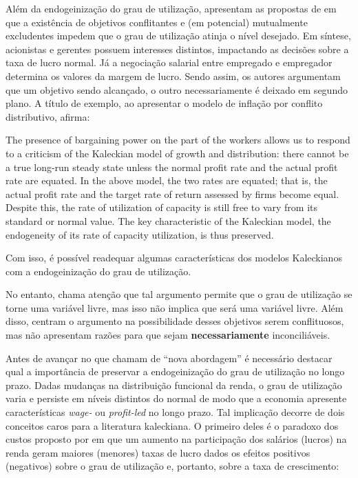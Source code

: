 Além da endogeinização do grau de utilização, \textcite{hein_harrodian_2012} apresentam as propostas de \textcite{dallery_conflicting_2011} em que a existência de objetivos conflitantes e (em potencial) mutualmente excludentes impedem que o grau de utilização atinja o nível desejado. Em síntese, acionistas e gerentes possuem interesses distintos, impactando as decisões sobre a taxa de lucro normal. Já a negociação salarial entre empregado e empregador determina os valores da margem de lucro. Sendo assim, os autores argumentam que um objetivo sendo alcançado, o outro necessariamente é deixado em segundo plano. A título de exemplo, ao apresentar o modelo de inflação por conflito distributivo, \textcite[p.~567]{lavoie_post-keynesian_2015} afirma:
\begin{citacao}
 The presence of bargaining power on the part of the workers allows
us to respond to a criticism of the Kaleckian model of growth and distribution: there
cannot be a true long-run steady state unless the normal profit rate and the actual profit
rate are equated. In the above model, the two rates are equated; that is, the actual profit
rate and the target rate of return assessed by firms become equal. Despite this, the rate
of utilization of capacity is still free to vary from its standard or normal value. The key
characteristic of the Kaleckian model, the endogeneity of its rate of capacity utilization,
is thus preserved.
\end{citacao}
Com isso, é possível readequar algumas características dos modelos Kaleckianos com a endogeinização do grau de utilização.

No entanto, \textcite[p.~125]{skott_theoretical_2012} chama atenção que  tal argumento permite que o grau de utilização se torne uma variável livre, mas isso não implica que será uma variável livre. 
Além disso, \textcite{dallery_conflicting_2011} centram o argumento na possibilidade desses objetivos serem conflituosos, mas não apresentam razões para que sejam \textbf{necessariamente} inconciliáveis.  

Antes de avançar no que \textcite{girardi_normal_2018} chamam de ``nova abordagem'' é necessário destacar qual a importância de preservar a endogeinização do grau de utilização no longo prazo. Dadas mudanças na distribuição funcional da renda, o grau de utilização varia e persiste em níveis distintos do normal de modo que a economia apresente características \textit{wage-} ou \textit{profit-led} no longo prazo. Tal implicação decorre de dois conceitos caros para a literatura kaleckiana. O primeiro deles é o paradoxo dos custos proposto por \textcite{rowthorn_demand_1981} em que um aumento na participação dos salários (lucros) na renda geram maiores (menores) taxas de lucro dados os efeitos positivos (negativos) sobre o grau de utilização e, portanto, sobre a taxa de crescimento:

